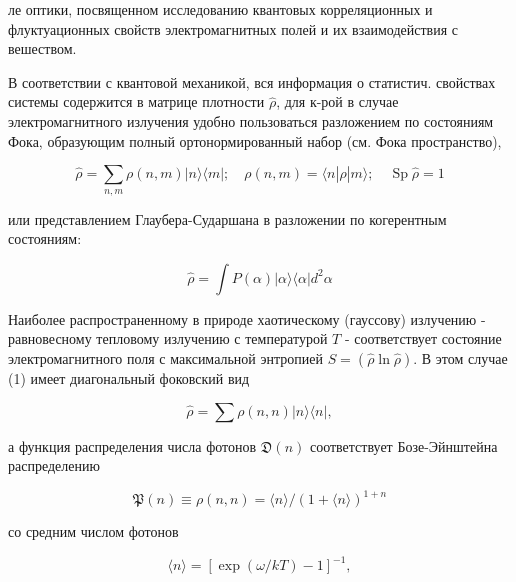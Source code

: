 \documentclass[10pt]{article}
\begin{document}
ле оптики, посвященном исследованию квантовых корреляционных и флуктуационных свойств электромагнитных полей и их взаимодействия с вешеством.



В соответствии с квантовой механикой, вся информация о статистич. свойствах системы содержится в матрице плотности $\hat{\rho}$, для к-рой в случае электромагнитного излучения удобно пользоваться разложением по состояниям Фока, образующим полный ортонормированный набор (см. Фока пространство),



\[

\hat{\rho}=\sum_{n, m} \rho(n, m)|n\rangle\langle m| ; \quad \rho(n, m)=\langle n|\hat{\rho}| m\rangle ; \quad \operatorname{Sp} \hat{\rho}=1

\]



или представлением Глаубера-Сударшана в разложении по когерентным состояниям:



\[

\hat{\rho}=\int P(\alpha)|\alpha\rangle\langle\alpha| d^{2} \alpha

\]



Наиболее распространенному в природе хаотическому (гауссову) излучению - равновесному тепловому излучению с температурой $T$ - соответствует состояние электромагнитного поля с максимальной энтропией $S=(\hat{\rho} \ln \hat{\rho})$. В этом случае (1) имеет диагональный фоковский вид



\[

\hat{\rho}=\sum \rho(n, n)|n\rangle\langle n|,

\]



а функция распределения числа фотонов $\mathfrak{D}(n)$ соответствует Бозе-Эйнштейна распределению



\[

\mathfrak{P}(n) \equiv \rho(n, n)=\langle n\rangle /(1+\langle n\rangle)^{1+n}

\]



со средним числом фотонов



\[

\langle n\rangle=[\exp (\omega / k T)-1]^{-1},

\]
\end{document}

